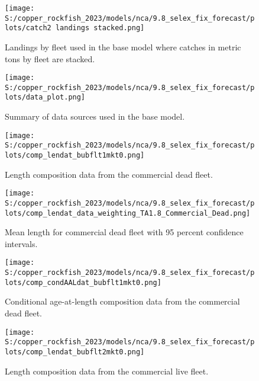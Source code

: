 \documentclass[
  letterpaper,
]{article}
\begin{document}
\pagebreak

\begin{figure}
\centering
\texttt{[image: S:/copper\_rockfish\_2023/models/nca/9.8\_selex\_fix\_forecast/plots/catch2 landings stacked.png]}
\caption{Landings by fleet used in the base model where catches in metric tons by fleet are stacked.\label{fig:catch}}
\end{figure}

\pagebreak

\begin{figure}
\centering
\texttt{[image: S:/copper\_rockfish\_2023/models/nca/9.8\_selex\_fix\_forecast/plots/data\_plot.png]}
\caption{Summary of data sources used in the base model.\label{fig:data-plot}}
\end{figure}

\pagebreak

\begin{figure}
\centering
\texttt{[image: S:/copper\_rockfish\_2023/models/nca/9.8\_selex\_fix\_forecast/plots/comp\_lendat\_bubflt1mkt0.png]}
\caption{Length composition data from the commercial dead fleet.\label{fig:com-dead-len-data}}
\end{figure}

\pagebreak

\begin{figure}
\centering
\texttt{[image: S:/copper\_rockfish\_2023/models/nca/9.8\_selex\_fix\_forecast/plots/comp\_lendat\_data\_weighting\_TA1.8\_Commercial\_Dead.png]}
\caption{Mean length for commercial dead fleet with 95 percent confidence intervals.\label{fig:mean-com-dead-len-data}}
\end{figure}

\pagebreak

\begin{figure}
\centering
\texttt{[image: S:/copper\_rockfish\_2023/models/nca/9.8\_selex\_fix\_forecast/plots/comp\_condAALdat\_bubflt1mkt0.png]}
\caption{Conditional age-at-length composition data from the commercial dead fleet.\label{fig:com-dead-age-data}}
\end{figure}

\pagebreak

\begin{figure}
\centering
\texttt{[image: S:/copper\_rockfish\_2023/models/nca/9.8\_selex\_fix\_forecast/plots/comp\_lendat\_bubflt2mkt0.png]}
\caption{Length composition data from the commercial live fleet.\label{fig:com-live-len-data}}
\end{figure}
\end{document}
